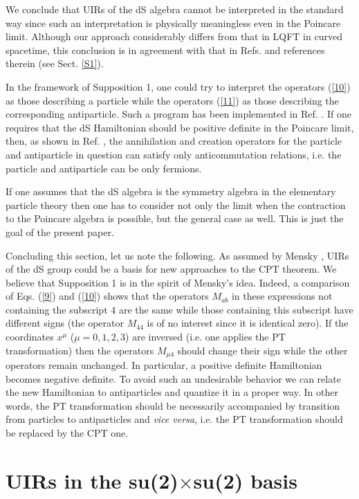 \documentclass[a4paper,12pt]{article}%
\begin{document}
We conclude that UIRs of the dS algebra cannot be 
interpreted in the standard way since such an
interpretation is physically meaningless even in
the Poincare limit. Although our approach 
considerably differs from that in LQFT in curved
spacetime, this conclusion is in agreement with
that in Refs. \cite{Narlikar,Susskind} and references 
therein (see Sect. \ref{S1}). 

In the framework of Supposition 1, one could try to
interpret the operators (\ref{10}) as those describing
a particle while the operators (\ref{11}) as those
describing the corresponding antiparticle. Such a
program has been implemented in Ref. \cite{hep}.
If one requires that the dS Hamiltonian should be
positive definite in the Poincare limit, then, as shown in Ref.
\cite{hep}, the annihilation and creation operators for
the particle and antiparticle in question can satisfy
only anticommutation relations, i.e. the particle and
antiparticle can be only fermions. 

If one assumes that the dS algebra
is the symmetry algebra in the elementary particle theory
then one has to consider not only the limit when
the contraction to the Poincare algebra is possible, but
the general case as well. This is just the goal of the 
present paper.

Concluding this section, let us note the following.
As assumed by Mensky \cite{Men}, UIRs of the dS
group could be a basis for new approaches to the CPT
theorem. We believe that Supposition 1 is in the spirit
of Mensky's idea. Indeed, a comparison of Eqs.
(\ref{9}) and (\ref{10}) shows that the operators
$M_{ab}$ in these expressions not containing the 
subscript 4 are the same while those containing 
this subscript have different signs (the operator
$M_{44}$ is of no interest since it is identical 
zero). If the coordinates $x^{\mu}$ ($\mu=0,1,2,3$)
are inversed (i.e. one applies the PT transformation)
then the operators $M_{\mu 4}$ should change their
sign while the other operators remain unchanged.
In particular, a positive definite Hamiltonian 
becomes negative definite. To avoid such an
undesirable behavior we can relate the new Hamiltonian
to antiparticles and quantize it in a proper way.
In other words, the PT transformation should be
necessarily accompanied by transition from particles to
antiparticles and {\it vice versa}, i.e. the PT 
transformation should be replaced by the CPT one.    

\section{UIRs in the su(2)$\times$su(2) basis}
\label{S4}
\end{document}
